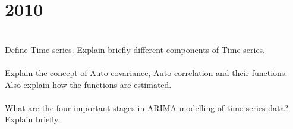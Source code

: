 \section*{2010}
\vspace{-.5cm}
\hrulefill \smallskip\\
 Define Time series. Explain briefly different components of Time series.
\\\\
 Explain the concept of Auto covariance, Auto correlation and their functions. Also explain how the functions are estimated.
\\\\
 What are the four important stages in ARIMA modelling of time series data? Explain briefly.